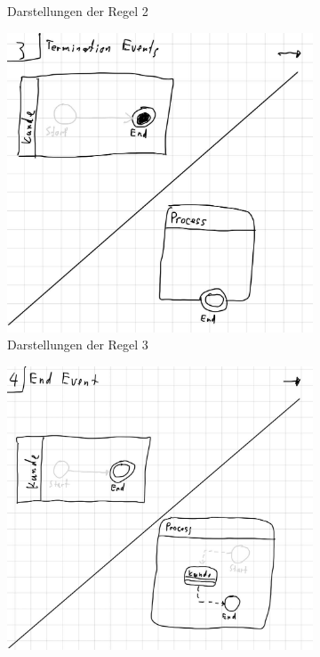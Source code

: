 \begin{figure}
\begin{subfigure}{0.4\textwidth}
        \caption{Darstellungen der Regel 2}%
        \label{fig:ruleExample2}
    \end{subfigure}
    \begin{subfigure}{0.4\textwidth}
        \vspace{20pt}
        \centering
        \includegraphics[width=\textwidth,keepaspectratio]{../images/rule/rule3.jpg}%
        \caption{Darstellungen der Regel 3}%
        \label{fig:ruleExample3}
    \end{subfigure}
    \hfill
    \begin{subfigure}{0.4\textwidth}
        \vspace{20pt}
        \centering
        \includegraphics[width=\textwidth,keepaspectratio]{../images/rule/rule4.jpg}%

\end{subfigure}
\end{figure}
